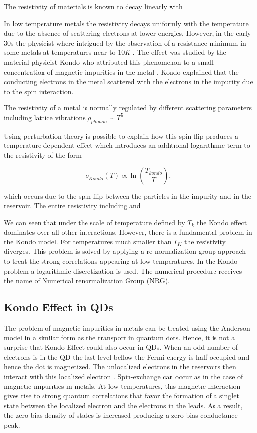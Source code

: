 The resistivity of materials is known to decay linearly with 

In low temperature metals the resistivity decays uniformly with the temperature due to the absence of scattering electrons at lower energies. However, in the early 30s the physicist where intrigued by the observation of a resistance minimum in some metals at temperatures near to $ 10K$ \cite{sindel_numerical_2005}.  The effect was studied by the material physicist  Kondo  who attributed this phenomenon to a small concentration of magnetic impurities in the metal \citep{hewson_kondo_1997}. Kondo explained that the conducting electrons in the metal scattered with the electrons in the impurity due to the spin interaction. 

The resistivity of a metal is normally regulated by different scattering parameters including lattice vibrations $\rho_{phonon} \sim T^5$


Using perturbation theory is possible to explain how this spin flip produces a  temperature dependent effect which  introduces an additional logarithmic term to the resistivity of the form

\begin{equation}
\rho_{Kondo}(T)  \propto \ln{\left( \frac{T_{kondo}}{T} \right)},
\label{logKondo}
\end{equation}



which occurs due to the spin-flip between the particles in the impurity and in the reservoir. The entire resistivity including  and 

We can seen that under the scale of temperature defined by $T_k$ the Kondo effect dominates over all other interactions. However, there is a fundamental problem in the Kondo model. For temperatures much smaller than $T_K$ the resistivity diverges. This problem is solved by applying a re-normalization group approach to treat the strong correlations appearing at low temperatures. In the Kondo problem a logarithmic discretization is used. The numerical procedure receives the name of Numerical renormalization Group (NRG). 


\subsection{Kondo Effect in QDs}


The problem of magnetic impurities in metals can be treated using the Anderson model in a similar form as the transport
 in quantum dots. Hence, it is not a surprise that Kondo Effect could also occur in QDs. When an odd number of electrons is in the QD the last level bellow the Fermi energy is half-occupied and hence the dot is magnetized. The unlocalized electrons in the reservoirs then interact with this localized electron . Spin-exchange can occur as in the case of  magnetic impurities in metals. At low temperatures, this magnetic  interaction gives rise to strong quantum correlations that favor the formation of a singlet state between the localized electron and the electrons in the leads. As a result, the zero-bias density of states is increased producing a zero-bias conductance peak. \\

